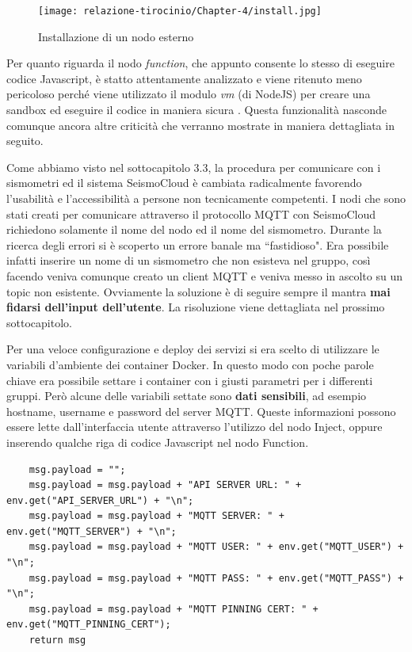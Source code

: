 \documentclass[a4paper,10pt]{memoir}
\begin{document}
\begin{figure}[ht]
    \texttt{[image: relazione-tirocinio/Chapter-4/install.jpg]}
    \caption{Installazione di un nodo esterno}
    \label{fig:install}
\end{figure}

Per quanto riguarda il nodo \textit{function}, che appunto consente lo stesso di eseguire codice Javascript, è statto attentamente analizzato e viene ritenuto meno pericoloso perché viene utilizzato il modulo \textit{vm} (di NodeJS) per creare una sandbox ed eseguire il codice in maniera sicura \cite{function}.
Questa funzionalità nasconde comunque ancora altre criticità che verranno mostrate in maniera dettagliata in seguito.

Come abbiamo visto nel sottocapitolo 3.3, la procedura per comunicare con i sismometri ed il sistema SeismoCloud è cambiata radicalmente favorendo l'usabilità e l'accessibilità a persone non tecnicamente competenti. I nodi che sono stati creati per comunicare attraverso il protocollo MQTT con SeismoCloud richiedono solamente il nome del nodo ed il nome del sismometro.
Durante la ricerca degli errori si è scoperto un errore banale ma ``fastidioso". Era possibile infatti inserire un nome di un sismometro che non esisteva nel gruppo, così facendo veniva comunque creato un client MQTT e veniva messo in ascolto su un topic non esistente.
Ovviamente la soluzione è di seguire sempre il mantra \textbf{mai fidarsi dell'input dell'utente}. La risoluzione viene dettagliata nel prossimo sottocapitolo.

Per una veloce configurazione e deploy dei servizi si era scelto di utilizzare le variabili d'ambiente dei container Docker. In questo modo con poche parole chiave era possibile settare i container con i giusti parametri per i differenti gruppi.
Però alcune delle variabili settate sono \textbf{dati sensibili}, ad esempio hostname, username e password del server MQTT.
Queste informazioni possono essere lette dall'interfaccia utente attraverso l'utilizzo del nodo Inject, oppure inserendo qualche riga di codice Javascript nel nodo Function.

\begin{lstlisting}
    msg.payload = "";
    msg.payload = msg.payload + "API SERVER URL: " + env.get("API_SERVER_URL") + "\n";
    msg.payload = msg.payload + "MQTT SERVER: " + env.get("MQTT_SERVER") + "\n";
    msg.payload = msg.payload + "MQTT USER: " + env.get("MQTT_USER") + "\n";
    msg.payload = msg.payload + "MQTT PASS: " + env.get("MQTT_PASS") + "\n";
    msg.payload = msg.payload + "MQTT PINNING CERT: " + env.get("MQTT_PINNING_CERT");
    return msg
\end{lstlisting}
\end{document}
